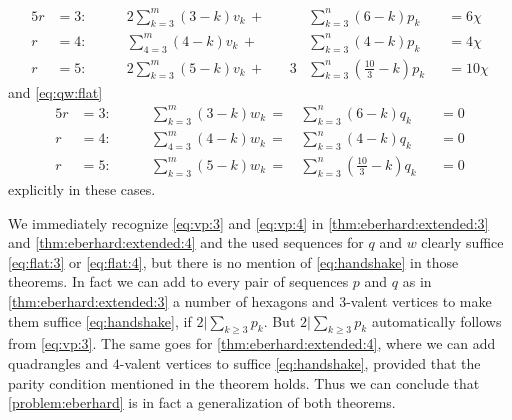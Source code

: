   \begin{alignat}{5}
  r &= 3: \qquad &2 \sum_{k=3}^m \left(3 - k \right) v_k\,+\, &&  & \sum_{k=3}^n \left(6 - k \right) p_k &&= 6 \chi \label{eq:vp:3}\\
  r &= 4: \qquad &  \sum_{4=3}^m \left(4 - k \right) v_k\,+\, &&  & \sum_{k=3}^n \left(4 - k \right) p_k &&= 4 \chi  \label{eq:vp:4}\\
  r &= 5: \qquad &2 \sum_{k=3}^m \left(5 - k \right) v_k\,+\, &&3 & \sum_{k=3}^n \left( \tfrac{10}{3} - k \right) p_k &&= 10 \chi \label{eq:vp:5}
  \end{alignat}
and \autoref{eq:qw:flat} 
\begin{alignat}{5}
  r &= 3: \qquad &  \sum_{k=3}^m \left(3 - k \right) w_k\,=\,&    \sum_{k=3}^n \left(6 - k \right) q_k &&= 0 \label{eq:flat:3}\\
  r &= 4: \qquad &  \sum_{4=3}^m \left(4 - k \right) w_k\,=\,&    \sum_{k=3}^n \left(4 - k \right) q_k &&= 0  \label{eq:flat:4}\\
  r &= 5: \qquad &  \sum_{k=3}^m \left(5 - k \right) w_k\,=\,&    \sum_{k=3}^n \left( \tfrac{10}{3} - k \right) q_k &&= 0 \label{eq:flat:5}
\end{alignat}
explicitly in these cases.

\begin{remark}
  We immediately recognize \autoref{eq:vp:3} and \autoref{eq:vp:4} in \autoref{thm:eberhard:extended:3} and \autoref{thm:eberhard:extended:4} and the used sequences for $q$ and $w$ clearly suffice \autoref{eq:flat:3} or \autoref{eq:flat:4}, but there is no mention of \autoref{eq:handshake} in those theorems. In fact we can add to every pair of sequences $p$ and $q$ as in \autoref{thm:eberhard:extended:3} a number of hexagons and $3$-valent vertices to make them suffice \autoref{eq:handshake}, if $2 | \sum_{k \geq 3} p_k$. But $2 | \sum_{k \geq 3} p_k$ automatically follows from \autoref{eq:vp:3}. The same goes for \autoref{thm:eberhard:extended:4}, where we can add quadrangles and $4$-valent vertices to suffice \autoref{eq:handshake}, provided that the parity condition mentioned in the theorem holds. Thus we can conclude that \autoref{problem:eberhard} is in fact a generalization of both theorems.
\end{remark}
